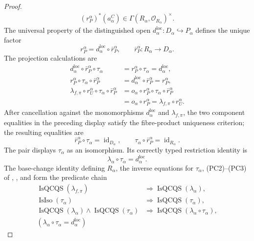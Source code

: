 \begin{proof}
\[\begin{gathered}
    (r_P^\alpha)^*(a^C_\alpha)
      \in\Gamma(R_\alpha,\mathcal O_{R_\alpha})^\times.
  \end{gathered}
  \]
  The universal property of the
  distinguished open $d^{\mathrm{loc}}_\alpha\colon D_\alpha\hookrightarrow
  P_\alpha$ defines the unique factor
  \[
    r_P^\alpha=d^{\mathrm{loc}}_\alpha\circ\bar r_P^\alpha,
    \qquad
    \bar r_P^\alpha\colon R_\alpha\to D_\alpha.
  \]
  The projection calculations are
  \[
  \begin{aligned}
    d^{\mathrm{loc}}_\alpha\circ\bar r_P^\alpha\circ\tau_\alpha
      &=r_P^\alpha\circ\tau_\alpha
       =d^{\mathrm{loc}}_\alpha,\\
    r_P^\alpha\circ\tau_\alpha\circ\bar r_P^\alpha
      &=d^{\mathrm{loc}}_\alpha\circ\bar r_P^\alpha=r_P^\alpha,\\
    \lambda_{f,\pi}\circ r_U^\alpha\circ\tau_\alpha\circ
      \bar r_P^\alpha
      &=o_\alpha\circ r_P^\alpha\circ\tau_\alpha\circ
        \bar r_P^\alpha\\
      &=o_\alpha\circ r_P^\alpha
       =\lambda_{f,\pi}\circ r_U^\alpha.
  \end{aligned}
  \]
  After cancellation against the monomorphisms
  $d^{\mathrm{loc}}_\alpha$ and $\lambda_{f,\pi}$, the two component
  equalities in the preceding display satisfy the fibre-product uniqueness
  criterion; the resulting equalities are
  \[
    \bar r_P^\alpha\circ\tau_\alpha=\operatorname{id}_{D_\alpha},
    \qquad
    \tau_\alpha\circ\bar r_P^\alpha=\operatorname{id}_{R_\alpha}.
  \]
  The pair displays $\tau_\alpha$ as an isomorphism.  Its correctly typed
  restriction identity is
  \[
    \lambda_\alpha\circ\tau_\alpha=d^{\mathrm{loc}}_\alpha.   \tag{ST10}
  \]
  The base-change identity defining $R_\alpha$, the inverse equations for
  $\tau_\alpha$, (PC2)--(PC3) of
  ,
  , and
   form the predicate chain
  \[
  \begin{aligned}
    \operatorname{IsQCQS}(\lambda_{f,\pi})
      &\Longrightarrow\operatorname{IsQCQS}(\lambda_\alpha),\\
    \operatorname{IsIso}(\tau_\alpha)
      &\Longrightarrow\operatorname{IsQCQS}(\tau_\alpha),\\
    \operatorname{IsQCQS}(\lambda_\alpha)\wedge
      \operatorname{IsQCQS}(\tau_\alpha)
      &\Longrightarrow
        \operatorname{IsQCQS}(\lambda_\alpha\circ\tau_\alpha),\\
    (\lambda_\alpha\circ\tau_\alpha=d^{\mathrm{loc}}_\alpha)

\end{aligned}\]
\end{proof}
